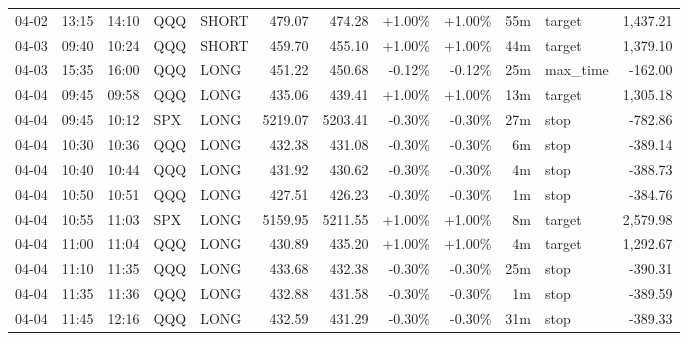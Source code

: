 \documentclass[11pt,a4paper]{article}
\begin{document}
\begin{center}
\begin{longtable}{>{\color{txtmain}}l l l l l r r r r r >{\color{txtmain}}l r}
04-02 & 13:15 & 14:10 & QQQ & SHORT & 479.07 & 474.28 & \textcolor{wingreen}{+1.00\%} & \textcolor{wingreen}{+1.00\%} & 55m & target & \textcolor{wingreen}{1,437.21} \\
04-03 & 09:40 & 10:24 & QQQ & SHORT & 459.70 & 455.10 & \textcolor{wingreen}{+1.00\%} & \textcolor{wingreen}{+1.00\%} & 44m & target & \textcolor{wingreen}{1,379.10} \\
04-03 & 15:35 & 16:00 & QQQ & LONG & 451.22 & 450.68 & \textcolor{lossred}{-0.12\%} & \textcolor{lossred}{-0.12\%} & 25m & max\_time & \textcolor{lossred}{-162.00} \\
04-04 & 09:45 & 09:58 & QQQ & LONG & 435.06 & 439.41 & \textcolor{wingreen}{+1.00\%} & \textcolor{wingreen}{+1.00\%} & 13m & target & \textcolor{wingreen}{1,305.18} \\
04-04 & 09:45 & 10:12 & SPX & LONG & 5219.07 & 5203.41 & \textcolor{lossred}{-0.30\%} & \textcolor{lossred}{-0.30\%} & 27m & stop & \textcolor{lossred}{-782.86} \\
04-04 & 10:30 & 10:36 & QQQ & LONG & 432.38 & 431.08 & \textcolor{lossred}{-0.30\%} & \textcolor{lossred}{-0.30\%} & 6m & stop & \textcolor{lossred}{-389.14} \\
04-04 & 10:40 & 10:44 & QQQ & LONG & 431.92 & 430.62 & \textcolor{lossred}{-0.30\%} & \textcolor{lossred}{-0.30\%} & 4m & stop & \textcolor{lossred}{-388.73} \\
04-04 & 10:50 & 10:51 & QQQ & LONG & 427.51 & 426.23 & \textcolor{lossred}{-0.30\%} & \textcolor{lossred}{-0.30\%} & 1m & stop & \textcolor{lossred}{-384.76} \\
04-04 & 10:55 & 11:03 & SPX & LONG & 5159.95 & 5211.55 & \textcolor{wingreen}{+1.00\%} & \textcolor{wingreen}{+1.00\%} & 8m & target & \textcolor{wingreen}{2,579.98} \\
04-04 & 11:00 & 11:04 & QQQ & LONG & 430.89 & 435.20 & \textcolor{wingreen}{+1.00\%} & \textcolor{wingreen}{+1.00\%} & 4m & target & \textcolor{wingreen}{1,292.67} \\
04-04 & 11:10 & 11:35 & QQQ & LONG & 433.68 & 432.38 & \textcolor{lossred}{-0.30\%} & \textcolor{lossred}{-0.30\%} & 25m & stop & \textcolor{lossred}{-390.31} \\
04-04 & 11:35 & 11:36 & QQQ & LONG & 432.88 & 431.58 & \textcolor{lossred}{-0.30\%} & \textcolor{lossred}{-0.30\%} & 1m & stop & \textcolor{lossred}{-389.59} \\
04-04 & 11:45 & 12:16 & QQQ & LONG & 432.59 & 431.29 & \textcolor{lossred}{-0.30\%} & \textcolor{lossred}{-0.30\%} & 31m & stop & \textcolor{lossred}{-389.33} \\

\end{longtable}
\end{center}
\end{document}
